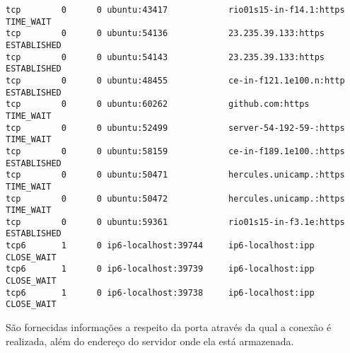\documentclass[a4paper,10pt]{article}
\begin{document}
\begin{lstlisting}
tcp        0      0 ubuntu:43417            rio01s15-in-f14.1:https TIME_WAIT  
tcp        0      0 ubuntu:54136            23.235.39.133:https     ESTABLISHED
tcp        0      0 ubuntu:54143            23.235.39.133:https     ESTABLISHED
tcp        0      0 ubuntu:48455            ce-in-f121.1e100.n:http ESTABLISHED
tcp        0      0 ubuntu:60262            github.com:https        TIME_WAIT  
tcp        0      0 ubuntu:52499            server-54-192-59-:https TIME_WAIT  
tcp        0      0 ubuntu:58159            ce-in-f189.1e100.:https ESTABLISHED
tcp        0      0 ubuntu:50471            hercules.unicamp.:https TIME_WAIT  
tcp        0      0 ubuntu:50472            hercules.unicamp.:https TIME_WAIT  
tcp        0      0 ubuntu:59361            rio01s15-in-f3.1e:https ESTABLISHED
tcp6       1      0 ip6-localhost:39744     ip6-localhost:ipp       CLOSE_WAIT 
tcp6       1      0 ip6-localhost:39739     ip6-localhost:ipp       CLOSE_WAIT 
tcp6       1      0 ip6-localhost:39738     ip6-localhost:ipp       CLOSE_WAIT 

\end{lstlisting}

São fornecidas informações a respeito da porta através da qual a conexão é realizada, além do endereço do servidor onde ela está armazenada.
\end{document}
